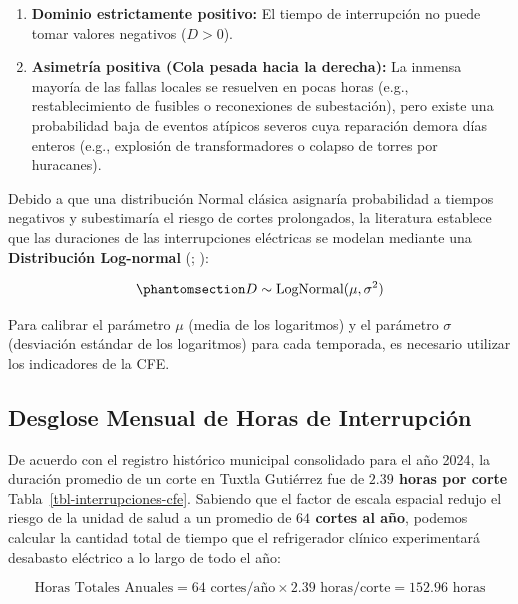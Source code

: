 \documentclass[
  spanish,
  us-letterpaper,
]{scrreprt}
\providecommand{\tightlist}{%
  \setlength{\itemsep}{0pt}\setlength{\parskip}{0pt}}
\numberwithin{equation}{section}
\theoremstyle{plain}
\theoremstyle{plain}
\theoremstyle{definition}
\theoremstyle{plain}
\theoremstyle{remark}
\begin{document}
\begin{enumerate}
\def\labelenumi{\arabic{enumi}.}
\tightlist
\item
  \textbf{Dominio estrictamente positivo:} El tiempo de interrupción no
  puede tomar valores negativos (\(D > 0\)).
\item
  \textbf{Asimetría positiva (Cola pesada hacia la derecha):} La inmensa
  mayoría de las fallas locales se resuelven en pocas horas (e.g.,
  restablecimiento de fusibles o reconexiones de subestación), pero
  existe una probabilidad baja de eventos atípicos severos cuya
  reparación demora días enteros (e.g., explosión de transformadores o
  colapso de torres por huracanes).
\end{enumerate}

Debido a que una distribución Normal clásica asignaría probabilidad a
tiempos negativos y subestimaría el riesgo de cortes prolongados, la
literatura establece que las duraciones de las interrupciones eléctricas
se modelan mediante una \textbf{Distribución Log-normal}
(;
):

\begin{equation}\phantomsection\label{eq-lognormal-def}{
D \sim \text{LogNormal}(\mu, \sigma^2)
}\end{equation}

Para calibrar el parámetro \(\mu\) (media de los logaritmos) y el
parámetro \(\sigma\) (desviación estándar de los logaritmos) para cada
temporada, es necesario utilizar los indicadores de la CFE.

\subsection{Desglose Mensual de Horas de
Interrupción}\label{desglose-mensual-de-horas-de-interrupciuxf3n}

De acuerdo con el registro histórico municipal consolidado para el año
2024, la duración promedio de un corte en Tuxtla Gutiérrez fue de
\textbf{\(2.39\) horas por corte} Tabla~\ref{tbl-interrupciones-cfe}.
Sabiendo que el factor de escala espacial redujo el riesgo de la unidad
de salud a un promedio de \textbf{\(64\) cortes al año}, podemos
calcular la cantidad total de tiempo que el refrigerador clínico
experimentará desabasto eléctrico a lo largo de todo el año:

\[
\text{Horas Totales Anuales} = 64 \text{ cortes/año} \times 2.39 \text{ horas/corte} = 152.96 \text{ horas}
\]
\end{document}
